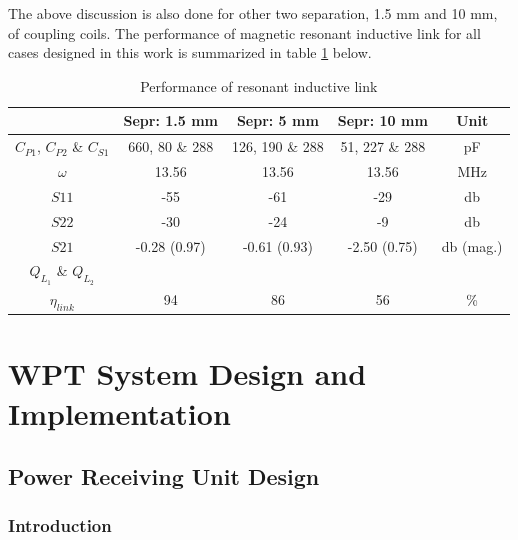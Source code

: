\documentclass[UKenglish]{ifimaster}  %
\begin{document}
The above discussion is also done for other two separation, 1.5 mm and 10 mm, of coupling coils. The performance of magnetic resonant inductive link for all cases designed in this work is summarized in table \ref{tab:ant_spec} below. 

\begin{table}[!htbp]
\caption{Performance of resonant inductive link} 
\begin{center}
\begin{tabular}{c|c|c|c|c}
\hline \hline
 								& \textbf{Sepr: 1.5 mm}	& \textbf{Sepr: 5 mm} 	& \textbf{Sepr: 10 mm}	& \textbf{Unit}		\\ \hline \hline
$C_{P1}$, $C_{P2}$ \& $C_{S1}$ 	& 660, 80 \& 288		& 126, 190 \& 288		& 51, 227 \& 288		& \si{\pico\farad}	\\ \hline
$\omega$						& 13.56					& 13.56					& 13.56					& \si{\mega\hertz}	\\ \hline
$S11$							& -55					& -61					& -29					& \si{\decibel}		\\ \hline
$S22$							& -30					& -24					& -9					& \si{\decibel} 	\\ \hline
$S21$							& -0.28 (0.97)			& -0.61 (0.93)			& -2.50 (0.75)			& \si{\decibel} (mag.)	\\ \hline
$Q_{L_{1}}$ \& $Q_{L_{2}}$		&						& 						& 						&					\\ \hline
$\eta_{link}$					& 94					& 86					& 56					& \% \\		
\hline \hline
\end{tabular}
\end{center}
\label{tab:ant_spec}
\end{table}%

\clearpage
\newpage


\part{WPT System Design and Implementation}      

\chapter{Power Receiving Unit Design} 

\section{Introduction}		%
\end{document}
